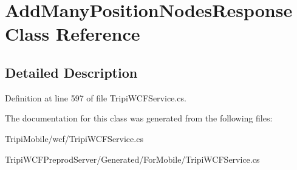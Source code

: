 \hypertarget{class_add_many_position_nodes_response}{
\section{AddManyPositionNodesResponse Class Reference}
\label{class_add_many_position_nodes_response}
}


\subsection{Detailed Description}


Definition at line 597 of file TripiWCFService.cs.

The documentation for this class was generated from the following files:\begin{DoxyCompactItemize}
\item 
TripiMobile/wcf/TripiWCFService.cs\item 
TripiWCFPreprodServer/Generated/ForMobile/TripiWCFService.cs\end{DoxyCompactItemize}
